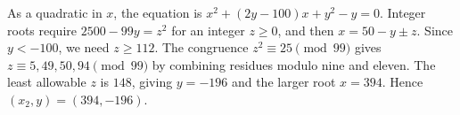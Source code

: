 As a quadratic in $x$, the equation is $x^2+(2y-100)x+y^2-y=0$. Integer roots require $2500-99y=z^2$ for an integer $z\ge0$, and then $x=50-y\pm z$. Since $y<-100$, we need $z\ge112$. The congruence $z^2\equiv25\pmod{99}$ gives $z\equiv5,49,50,94\pmod{99}$ by combining residues modulo nine and eleven. The least allowable $z$ is $148$, giving $y=-196$ and the larger root $x=394$. Hence $\boxed{(x_2,y)=(394,-196)}$.
